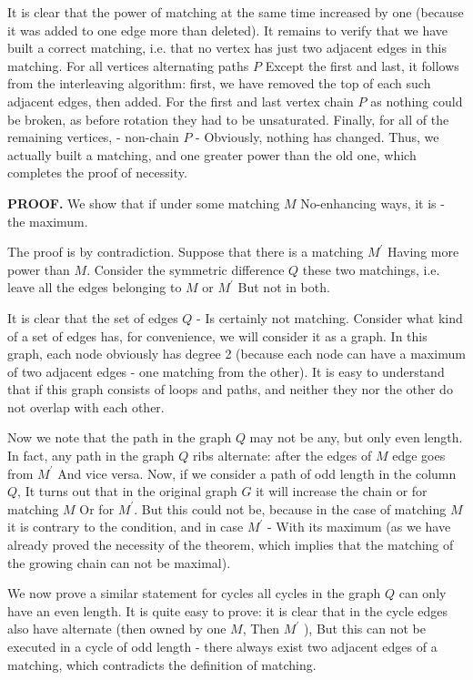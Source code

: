 It is clear that the power of matching at the same time increased by one (because it was added to one edge more than deleted). It remains to verify that we have built a correct matching, i.e. that no vertex has just two adjacent edges in this matching. For all vertices alternating paths $P$ Except the first and last, it follows from the interleaving algorithm: first, we have removed the top of each such adjacent edges, then added. For the first and last vertex chain $P$ as nothing could be broken, as before rotation they had to be unsaturated. Finally, for all of the remaining vertices, - non-chain $P$ - Obviously, nothing has changed. Thus, we actually built a matching, and one greater power than the old one, which completes the proof of necessity.

\textbf{PROOF.} We show that if under some matching $M$ No-enhancing ways, it is - the maximum.

The proof is by contradiction. Suppose that there is a matching $M ^ \prime$ Having more power than $M$. Consider the symmetric difference $Q$ these two matchings, i.e. leave all the edges belonging to $M$ or $M ^ \prime$ But not in both.

It is clear that the set of edges $Q$ - Is certainly not matching. Consider what kind of a set of edges has, for convenience, we will consider it as a graph. In this graph, each node obviously has degree 2 (because each node can have a maximum of two adjacent edges - one matching from the other). It is easy to understand that if this graph consists of loops and paths, and neither they nor the other do not overlap with each other.

Now we note that the path in the graph $Q$ may not be any, but only even length. In fact, any path in the graph $Q$ ribs alternate: after the edges of $M$ edge goes from $M ^ \prime$ And vice versa. Now, if we consider a path of odd length in the column $Q$, It turns out that in the original graph $G$ it will increase the chain or for matching $M$ Or for $M ^ \prime$. But this could not be, because in the case of matching $M$ it is contrary to the condition, and in case $M ^ \prime$ - With its maximum (as we have already proved the necessity of the theorem, which implies that the matching of the growing chain can not be maximal).

We now prove a similar statement for cycles all cycles in the graph $Q$ can only have an even length. It is quite easy to prove: it is clear that in the cycle edges also have alternate (then owned by one $M$, Then $M ^ \prime$ ), But this can not be executed in a cycle of odd length - there always exist two adjacent edges of a matching, which contradicts the definition of matching.

